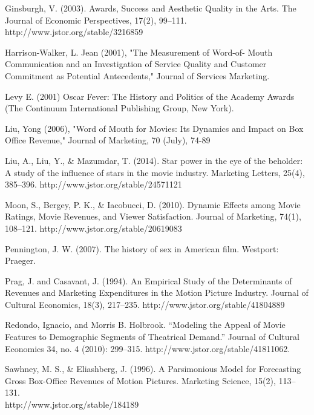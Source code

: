 \documentclass[11pt]{article} %
\begin{document}
Ginsburgh, V. (2003). Awards, Success and Aesthetic Quality in the Arts. The Journal of Economic Perspectives, 17(2), 99–111. http://www.jstor.org/stable/3216859 

Harrison-Walker, L. Jean (2001), "The Measurement of Word-of- Mouth Communication and an Investigation of Service Quality and Customer Commitment as Potential Antecedents," Journal of Services Marketing. 

Levy E. (2001) Oscar Fever: The History and Politics of the Academy Awards (The Continuum International Publishing Group, New York). 

Liu, Yong (2006), "Word of Mouth for Movies: Its Dynamics and Impact on Box Office Revenue," Journal of Marketing, 70 (July), 74-89

Liu, A., Liu, Y., & Mazumdar, T. (2014). Star power in the eye of the beholder: A study of the influence of stars in the movie industry. Marketing Letters, 25(4), 385–396. http://www.jstor.org/stable/24571121

Moon, S., Bergey, P. K., & Iacobucci, D. (2010). Dynamic Effects among Movie Ratings, Movie Revenues, and Viewer Satisfaction. Journal of Marketing, 74(1), 108–121. http://www.jstor.org/stable/20619083 

  Pennington, J. W. (2007). The history of sex in American film. Westport: Praeger.

Prag, J. and Casavant, J. (1994). An Empirical Study of the Determinants of Revenues and Marketing Expenditures in the Motion Picture Industry. Journal of Cultural Economics, 18(3), 217–235. http://www.jstor.org/stable/41804889 

Redondo, Ignacio, and Morris B. Holbrook. “Modeling the Appeal of Movie Features to Demographic Segments of Theatrical Demand.” Journal of Cultural Economics 34, no. 4 (2010): 299–315. http://www.jstor.org/stable/41811062.
 
Sawhney, M. S., & Eliashberg, J. (1996). A Parsimonious Model for Forecasting Gross Box-Office Revenues of Motion Pictures. Marketing Science, 15(2), 113–131.\\ http://www.jstor.org/stable/184189
\end{document}
